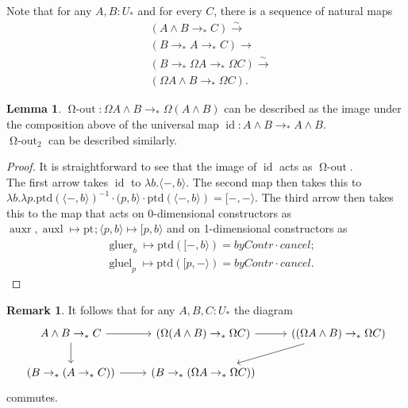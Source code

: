 \documentclass{amsart}
\theoremstyle{definition}
\newtheorem{re}[theorem]{Remark}
\newtheorem{lem}[theorem]{Lemma}
\newcommand{\id}{\operatorname{id}}
\newcommand{\gluel}{\operatorname{gluel}}
\newcommand{\gluer}{\operatorname{gluer}}
\newcommand{\auxl}{\operatorname{auxl}}
\newcommand{\auxr}{\operatorname{auxr}}
\newcommand{\bs}[1]{\mathrm{pt}_{#1}}
\newcommand{\pto}{\to_*}
\newcommand{\oout}{\operatorname{\Omega-out}}
\newcommand{\lps}[2]{(#1, #2 \rangle}
\begin{document}
Note that for any $A, B: U_*$ and for every $C$, there is a sequence of natural maps
    \begin{align*}
        &(A \wedge B \pto C) \xrightarrow{\sim} \\
        &(B \pto A \pto C) \to \\
        &(B \pto \Omega A \pto \Omega C) \xrightarrow{\sim} \\
        &(\Omega A \wedge B \pto \Omega C).
    \end{align*}
\begin{lem}\label{le:oout-desription}
    $\oout: \Omega A \wedge B \pto \Omega (A \wedge B)$ can be described as the image under the composition above
    of the universal map $\id: A \wedge B \pto A \wedge B$.
    \\
    $\oout_2$ can be described similarly.
\end{lem}
\begin{proof}
    It is straightforward to see that the image of $\id$ acts as $\oout$.
    \\
    The first arrow takes $\id$ to $\lambda b.\langle -, b \rangle$.
    The second map then takes this to $\lambda b. \lambda p. \mathrm{ptd}(\langle -, b \rangle)^{-1} \cdot \lps{p}{b} \cdot \mathrm{ptd}(\langle -, b \rangle) = [-, - \rangle$.
    The third arrow then takes this to the map that acts on 0-dimensional constructors as $\auxr, \auxl \mapsto \bs{}; \langle p, b \rangle \mapsto [p, b \rangle$ and on 1-dimensional constructors as
    \begin{align*}
    & \gluer_{b} \mapsto \mathrm{ptd}([-, b\rangle) = byContr \cdot cancel; \\
    & \gluel_{p} \mapsto \mathrm{ptd}([p, - \rangle) = byContr \cdot cancel.
    \end{align*}
\end{proof}

\begin{re}\label{re:oout-desription}
    It follows that for any $A, B, C : U_*$ the diagram
    \[\begin{tikzcd}
    	{A \wedge B \pto C} & {(\Omega (A \wedge B) \pto \Omega C)} & {((\Omega A \wedge B) \pto \Omega C)} \\
    	{(B \pto (A \pto C))} & {(B \pto (\Omega A \pto \Omega C))}
    	\arrow[from=1-1, to=1-2]
    	\arrow[from=1-1, to=2-1]
    	\arrow[from=1-2, to=1-3]
    	\arrow[from=1-3, to=2-2]
    	\arrow[from=2-1, to=2-2]
    \end{tikzcd}\]
commutes.
\end{re}
\end{document}
